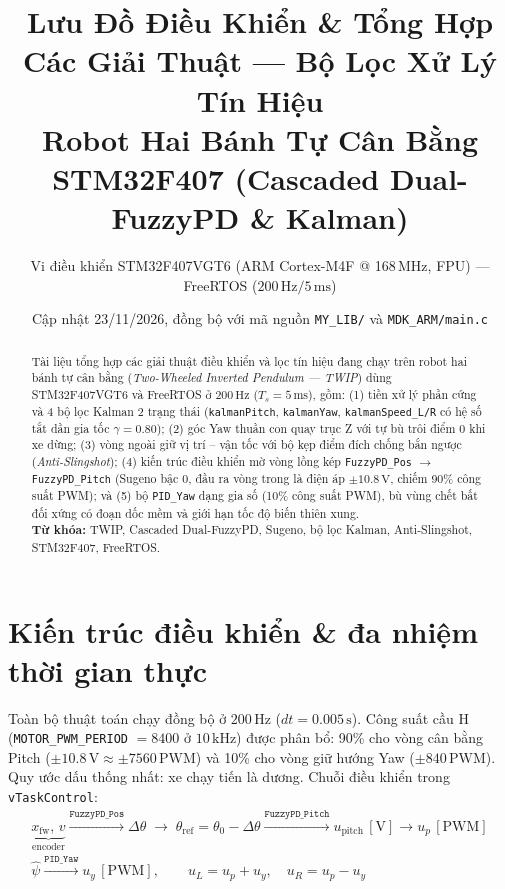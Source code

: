 \documentclass[10pt,a4paper]{article}
\title{\Large\textbf{Lưu Đồ Điều Khiển \& Tổng Hợp Các Giải Thuật --- Bộ Lọc Xử Lý Tín Hiệu\\Robot Hai Bánh Tự Cân Bằng STM32F407 (Cascaded Dual-FuzzyPD \& Kalman)}}
\author{\small Vi điều khiển STM32F407VGT6 (ARM Cortex-M4F @ 168\,MHz, FPU) --- FreeRTOS ($200\,\text{Hz} / 5\,\text{ms}$)}
\date{\small Cập nhật 23/11/2026, đồng bộ với mã nguồn \texttt{MY\_LIB/} và \texttt{MDK\_ARM/main.c}}
\begin{document}
\maketitle

\begin{abstract}
\noindent Tài liệu tổng hợp các giải thuật điều khiển và lọc tín hiệu đang chạy trên robot hai bánh tự cân bằng (\textit{Two-Wheeled Inverted Pendulum --- TWIP}) dùng STM32F407VGT6 và FreeRTOS ở $200\,\text{Hz}$ ($T_s = 5\,\text{ms}$), gồm: (1) tiền xử lý phần cứng và 4 bộ lọc Kalman 2 trạng thái (\texttt{kalmanPitch}, \texttt{kalmanYaw}, \texttt{kalmanSpeed\_L/R} có hệ số tắt dần gia tốc $\gamma = 0.80$); (2) góc Yaw thuần con quay trục Z với tự bù trôi điểm 0 khi xe dừng; (3) vòng ngoài giữ vị trí -- vận tốc với bộ kẹp điểm đích chống bắn ngược (\textit{Anti-Slingshot}); (4) kiến trúc điều khiển mờ vòng lồng kép \texttt{FuzzyPD\_Pos} $\rightarrow$ \texttt{FuzzyPD\_Pitch} (Sugeno bậc 0, đầu ra vòng trong là điện áp $\pm 10.8\,\text{V}$, chiếm 90\% công suất PWM); và (5) bộ \texttt{PID\_Yaw} dạng gia số (10\% công suất PWM), bù vùng chết bất đối xứng có đoạn dốc mềm và giới hạn tốc độ biến thiên xung.\\[3pt]
\noindent\textbf{Từ khóa:} TWIP, Cascaded Dual-FuzzyPD, Sugeno, bộ lọc Kalman, Anti-Slingshot, STM32F407, FreeRTOS.
\end{abstract}

\section{Kiến trúc điều khiển \& đa nhiệm thời gian thực}
Toàn bộ thuật toán chạy đồng bộ ở $200\,\text{Hz}$ ($dt = 0.005\,\text{s}$). Công suất cầu H (\texttt{MOTOR\_PWM\_PERIOD} $= 8400$ ở $10\,\text{kHz}$) được phân bổ: 90\% cho vòng cân bằng Pitch ($\pm 10.8\,\text{V} \approx \pm 7560\,\text{PWM}$) và 10\% cho vòng giữ hướng Yaw ($\pm 840\,\text{PWM}$). Quy ước dấu thống nhất: xe chạy tiến là dương. Chuỗi điều khiển trong \texttt{vTaskControl}:
\begin{gather*}
\underbrace{x_{\text{fw}},\, v}_{\text{encoder}} \xrightarrow{\texttt{FuzzyPD\_Pos}} \Delta\theta \;\rightarrow\; \theta_{\text{ref}} = \theta_0 - \Delta\theta \xrightarrow{\texttt{FuzzyPD\_Pitch}} u_{\text{pitch}}\,[\text{V}] \rightarrow u_p\,[\text{PWM}] \\
\hat{\psi} \xrightarrow{\texttt{PID\_Yaw}} u_y\,[\text{PWM}], \qquad u_L = u_p + u_y, \quad u_R = u_p - u_y
\end{gather*}
\end{document}
